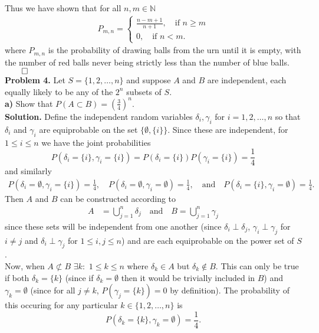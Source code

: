 \documentclass[11pt, letterpaper]{article}
\newcommand{\mbb}[1]{\mathbb{#1}}
\begin{document}
    Thus we have shown that for all $n,m\in\mbb{N}$
    \begin{align*}
        P_{m,n}=\begin{cases}
            \frac{n-m+1}{n+1},\quad\text{if $n\geq m$}\\
            0,\quad\text{if $n<m$.}
        \end{cases}
    \end{align*}
    where $P_{m,n}$ is the probability of drawing balls from the urn until it is empty, with the number of red balls never being strictly less than the number of blue balls.\hfill{$\qed$}\\[10pt]
    {\bf Problem 4.} Let $S=\{1,2,\dots,n\}$ and suppose $A$ and $B$ are independent, each equally likely to be any of the $2^n$ subsets of $S$.\\[10pt]
    {\bf a)} Show that $P(A\subset B)=\left(\frac{3}{4}\right)^n$.\\[10pt]
    {\bf Solution.} Define the independent random variables $\delta_i,\gamma_i$ for $i=1,2,\dots,n$ so that $\delta_i$ and $\gamma_i$ are equiprobable on the set $\{\emptyset, \{i\}\}$. Since these are independent, for $1\leq i\leq n$ we have the joint probabilities
    \[P(\delta_i=\{i\},\gamma_i=\{i\})=P(\delta_i=\{i\})P(\gamma_i=\{i\})=\frac{1}{4}\]
    and similarly
    \begin{align*}
        P(\delta_i=\emptyset,\gamma_i=\{i\})=\frac{1}{4},\quad
        P(\delta_i=\emptyset,\gamma_i=\emptyset)=\frac{1}{4},\quad\text{and}\quad
        P(\delta_i=\{i\},\gamma_i=\emptyset)=\frac{1}{4}.
    \end{align*}
    Then $A$ and $B$ can be constructed according to
    \begin{align*}
        A&=\bigcup_{j=1}^n\delta_j\quad\text{and}\quad B=\bigcup_{j=1}^n\gamma_j
    \end{align*}
    since these sets will be independent from one another (since $\delta_i\perp\delta_j$, $\gamma_i\perp\gamma_j$ for $i\neq j$ and $\delta_i\perp\gamma_j$ for $1\leq i,j\leq n$) and are each equiprobable on the power set of $S$.\\[10pt] 
    Now, when $A\not\subset B$ $\exists k:$ $1\leq k\leq n$ where $\delta_k\in A$ but $\delta_k\notin B$. This can only be true if both $\delta_k=\{k\}$ (since if $\delta_k=\emptyset$ then it would
    be trivially included in $B$) and $\gamma_k=\emptyset$ (since for all $j\neq k$, $P(\gamma_j=\{k\})=0$ by definition). The probability of this occuring for any particular $k\in\{1,2,\dots,n\}$ is
    \[P(\delta_k=\{k\},\gamma_k=\emptyset)=\frac{1}{4}.\]
\end{document}
